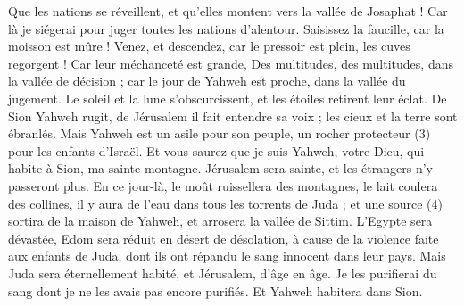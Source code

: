 \begin{multicols}{2}
Que les nations se réveillent, et qu'elles montent vers la vallée de Josaphat ! Car là je siégerai pour juger toutes les nations d'alentour.
Saisissez la faucille, car la moisson est mûre ! Venez, et descendez, car le pressoir est plein, les cuves regorgent ! Car leur méchanceté est grande,
Des multitudes, des multitudes, dans la vallée de décision ; car le jour de Yahweh est proche, dans la vallée du jugement.
Le soleil et la lune s’obscurcissent, et les étoiles retirent leur éclat.
De Sion Yahweh rugit, de Jérusalem il fait entendre sa voix ; les cieux et la terre sont ébranlés. Mais Yahweh est un asile pour son peuple, un rocher protecteur (3) pour les enfants d’Israël.
Et vous saurez que je suis Yahweh, votre Dieu, qui habite à Sion, ma sainte montagne. Jérusalem sera sainte, et les étrangers n'y passeront plus.
En ce jour-là, le moût ruissellera des montagnes, le lait coulera des collines, il y aura de l’eau dans tous les torrents de Juda ; et une source (4) sortira de la maison de Yahweh, et arrosera la vallée de Sittim.
L'Egypte sera dévastée, Edom sera réduit en désert de désolation, à cause de la violence faite aux enfants de Juda, dont ils ont répandu le sang innocent dans leur pays.
Mais Juda sera éternellement habité, et Jérusalem, d’âge en âge.
Je les purifierai du sang dont je ne les avais pas encore purifiés. Et Yahweh habitera dans Sion.
\PPE{}
\end{multicols}
